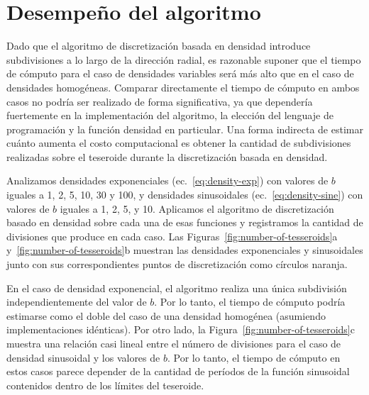 
\section{Desempeño del algoritmo}

Dado que el algoritmo de discretización basada en densidad introduce
subdivisiones a lo largo de la dirección radial, es razonable suponer que el
tiempo de cómputo para el caso de densidades variables será más alto que en el
caso de densidades homogéneas.
Comparar directamente el tiempo de cómputo en ambos casos no podría ser
realizado de forma significativa, ya que dependería fuertemente en la
implementación del algoritmo, la elección del lenguaje de programación y la
función densidad en particular.
Una forma indirecta de estimar cuánto aumenta el costo computacional es obtener
la cantidad de subdivisiones realizadas sobre el teseroide durante la
discretización basada en densidad.

Analizamos densidades exponenciales (ec.~\ref{eq:density-exp}) con valores de
$b$ iguales a 1, 2, 5, 10, 30 y 100, y densidades sinusoidales
(ec.~\ref{eq:density-sine}) con valores de $b$ iguales a 1, 2, 5, y 10.
Aplicamos el algoritmo de discretización basado en densidad sobre cada una de
esas funciones y registramos la cantidad de divisiones que produce en cada
caso.
Las Figuras~\ref{fig:number-of-tesseroids}a y~\ref{fig:number-of-tesseroids}b
muestran las densidades exponenciales y sinusoidales junto con sus
correspondientes puntos de discretización como círculos naranja.

En el caso de densidad exponencial, el algoritmo realiza una única subdivisión
independientemente del valor de $b$.
Por lo tanto, el tiempo de cómputo podría estimarse como el doble del caso de
una densidad homogénea (asumiendo implementaciones idénticas).
Por otro lado, la Figura~\ref{fig:number-of-tesseroids}c muestra una relación
casi lineal entre el número de divisiones para el caso de densidad sinusoidal
y los valores de $b$.
Por lo tanto, el tiempo de cómputo en estos casos parece depender de la
cantidad de períodos de la función sinusoidal contenidos dentro de los límites
del teseroide.

